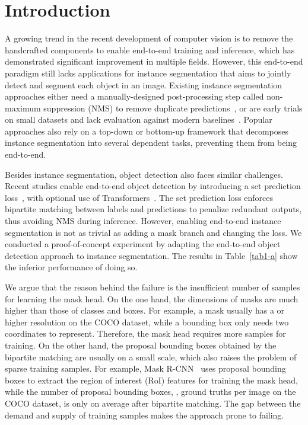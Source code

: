 \documentclass[10pt,twocolumn,letterpaper]{article}
\begin{document}
\section{Introduction}
A growing trend in the recent development of computer vision is to remove the handcrafted components to enable end-to-end training and inference, which has demonstrated significant improvement in multiple fields.
However, this end-to-end paradigm still lacks applications for instance segmentation that aims to jointly detect and segment each object in an image.
Existing instance segmentation approaches either need a manually-designed post-processing step called non-maximum suppression (NMS) to remove duplicate predictions~\cite{he2017mask,liu2018path,huang2019mask,chen2020blendmask,lee2020centermask,wang2020solo}, or are early trials on small datasets and lack evaluation against modern baselines~\cite{ren2017end,romera2016recurrent}.
Popular approaches also rely on a top-down or bottom-up framework that decomposes instance segmentation into several dependent tasks, preventing them from being end-to-end.

Besides instance segmentation, object detection also faces similar challenges.
Recent studies enable end-to-end object detection by introducing a set prediction loss~\cite{hu2018relation,carion2020end,sun2020sparse,wang2020end,zhu2020deformable}, with optional use of Transformers~\cite{vaswani2017attention}.
The set prediction loss enforces bipartite matching between labels and predictions to penalize redundant outputs, thus avoiding NMS during inference.
However, enabling end-to-end instance segmentation is not as trivial as adding a mask branch and changing the loss.
We conducted a proof-of-concept experiment by adapting the end-to-end object detection approach to instance segmentation.
The results in Table~\ref{tab1-a} show the inferior performance of doing so.


We argue that the reason behind the failure is the insufficient number of samples for learning the mask head.
On the one hand, the dimensions of masks are much higher than those of classes and boxes.
For example, a mask usually has a  or higher resolution on the COCO dataset, while a bounding box only needs two coordinates to represent.
Therefore, the mask head requires more samples for training.
On the other hand, the proposal bounding boxes obtained by the bipartite matching are usually on a small scale, which also raises the problem of sparse training samples.
For example, Mask R-CNN~\cite{he2017mask} uses  proposal bounding boxes to extract the region of interest (RoI) features for training the mask head, while the number of proposal bounding boxes, \ie, ground truths per image on the COCO dataset, is only  on average after bipartite matching.
The gap between the demand and supply of training samples makes the approach prone to failing.
\end{document}
